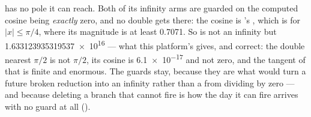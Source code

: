\begin{description}[style=nextline,leftmargin=5.2em]
     has no pole it can reach. Both of its infinity arms are guarded on
    the computed cosine being \emph{exactly} zero, and no double gets there: the
    cosine is 's , which is 
    for $|x| \le \pi/4$, where its magnitude is at least \num{0.7071}. So
     is not an infinity but \num{1.633123935319537e16} --- what this
    platform's  gives, and correct: the double nearest $\pi/2$ is not
    $\pi/2$, its cosine is \num{6.1e-17} and not zero, and the tangent of that is
    finite and enormous. The guards stay, because they are what would turn a
    future broken reduction into an infinity rather than a  from
    dividing by zero --- and because deleting a branch that cannot fire is how the
    day it can fire arrives with no guard at all
    ().


\end{description}

